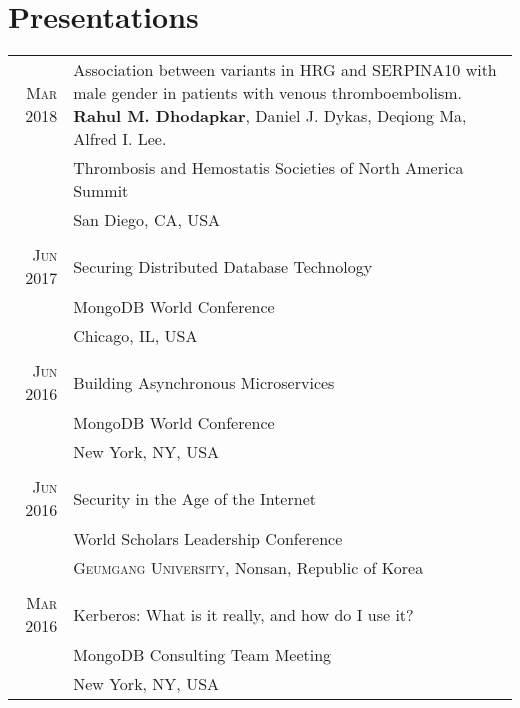 \documentclass[a4paper,10pt]{article}
\begin{document}
\section{Presentations}
\begin{tabular}{rp{11cm}}
 \textsc{Mar} 2018 & Association between variants in HRG and SERPINA10 with male gender in patients with venous thromboembolism.
 {\bf Rahul M. Dhodapkar},  Daniel J. Dykas,  Deqiong Ma,  Alfred I. Lee. \\
 								 & Thrombosis and Hemostatis Societies of North America Summit \\
 								 & San Diego, CA, USA  \\
 \multicolumn{2}{c}{} \\
 \textsc{Jun} 2017 & Securing Distributed Database Technology \\
 								 & MongoDB World Conference\\
 								 & Chicago, IL, USA  \\
 \multicolumn{2}{c}{} \\
 \textsc{Jun} 2016 & Building Asynchronous Microservices \\
 								 & MongoDB World Conference\\
 								 & New York, NY, USA  \\
 \multicolumn{2}{c}{} \\
 \textsc{Jun} 2016 & Security in the Age of the Internet\\
 							    &  World Scholars Leadership Conference\\
 							    &  \textsc{Geumgang University}, Nonsan, Republic of Korea \\
 \multicolumn{2}{c}{} \\
 \textsc{Mar} 2016 & Kerberos: What is it really, and how do I use it?\\
 							    &  MongoDB Consulting Team Meeting\\
 							    &  New York, NY, USA \\
\end{tabular}
\end{document}
